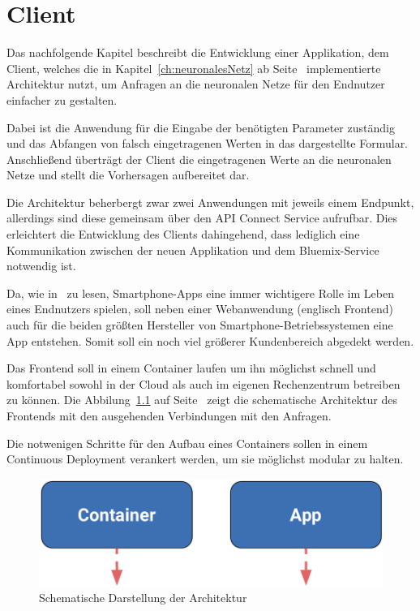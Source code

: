 \chapter{Client}
\label{ch:client}
Das nachfolgende Kapitel beschreibt die Entwicklung einer Applikation, dem Client, welches die in
Kapitel~\ref{ch:neuronalesNetz} ab Seite~\pageref{ch:neuronalesNetz} implementierte Architektur nutzt, um Anfragen an
die neuronalen Netze für den Endnutzer einfacher zu gestalten.

Dabei ist die Anwendung für die Eingabe der benötigten Parameter zuständig und das Abfangen von falsch eingetragenen
Werten in das dargestellte Formular. Anschließend überträgt der Client die eingetragenen Werte an die neuronalen Netze
und stellt die Vorhersagen aufbereitet dar.

Die Architektur beherbergt zwar zwei Anwendungen mit jeweils einem Endpunkt, allerdings sind diese gemeinsam über
den API Connect Service aufrufbar. Dies erleichtert die Entwicklung des Clients dahingehend, dass lediglich eine
Kommunikation zwischen der neuen Applikation und dem Bluemix-Service notwendig ist.

Da, wie in~\cite{online_client_apps} zu lesen, Smartphone-Apps eine immer wichtigere Rolle im Leben eines Endnutzers
spielen, soll neben einer Webanwendung (englisch Frontend) auch für die beiden größten Hersteller von
Smartphone-Betriebssystemen eine App entstehen. Somit soll ein noch viel größerer Kundenbereich abgedekt werden.

Das Frontend soll in einem Container laufen um ihn möglichst schnell und komfortabel sowohl in der Cloud als auch 
im eigenen Rechenzentrum betreiben zu können. Die Abbilung~\ref{fig:schematische_architektur_4} auf
Seite~\pageref{fig:schematische_architektur_4} zeigt die schematische Architektur des Frontends mit den ausgehenden
Verbindungen mit den Anfragen.

Die notwenigen Schritte für den Aufbau eines Containers sollen in einem Continuous Deployment verankert werden, um sie
möglichst modular zu halten.

\begin{figure}[h]
    \centering
    \includegraphics[scale=0.5]{images/kapitel_4/architektur_schematisch.pdf}
    \caption{Schematische Darstellung der Architektur}
    \label{fig:schematische_architektur_4}
\end{figure}